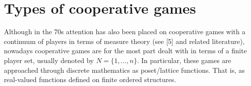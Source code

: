 \chapter{Types of cooperative games}


	Although in the 70s attention has also been placed on cooperative games with a continuum of players in terms of measure theory (see [5] and related literature), nowadays cooperative games are for the most part dealt with in terms of a finite player set, usually denoted by $N = \{1,...,n\}$. In particular, these games are approached through discrete mathematics as poset/lattice functions. That is, as real-valued functions defined on finite ordered structures. 
	
		
